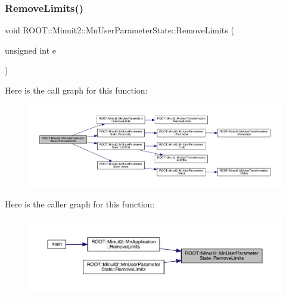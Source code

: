 \mbox{\label{classROOT_1_1Minuit2_1_1MnUserParameterState_a1ae57d606384e08b0e710c4908543524}} 
\subsubsection{\texorpdfstring{RemoveLimits()}{RemoveLimits()}\hspace{0.1cm}{\footnotesize\ttfamily [3/6]}}
{\footnotesize\ttfamily void R\+O\+O\+T\+::\+Minuit2\+::\+Mn\+User\+Parameter\+State\+::\+Remove\+Limits (\begin{DoxyParamCaption}\item[{unsigned int}]{e }\end{DoxyParamCaption})}

Here is the call graph for this function\+:
\nopagebreak
\begin{figure}[H]
\begin{center}
\leavevmode
\includegraphics[width=350pt]{d3/de0/classROOT_1_1Minuit2_1_1MnUserParameterState_a1ae57d606384e08b0e710c4908543524_cgraph}
\end{center}
\end{figure}
Here is the caller graph for this function\+:
\nopagebreak
\begin{figure}[H]
\begin{center}
\leavevmode
\includegraphics[width=350pt]{d3/de0/classROOT_1_1Minuit2_1_1MnUserParameterState_a1ae57d606384e08b0e710c4908543524_icgraph}
\end{center}
\end{figure}
\mbox{\label{classROOT_1_1Minuit2_1_1MnUserParameterState_ac71dfd669559be76ed62fdf221a017d5}} 
